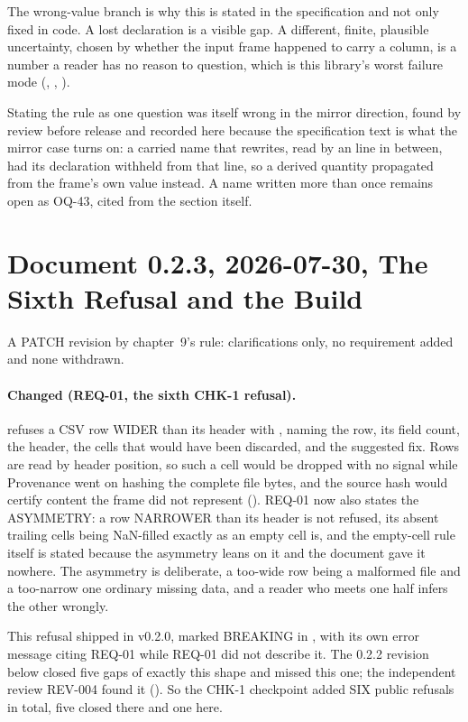 The wrong-value branch is why this is stated in the specification and not
only fixed in code. A lost declaration is a visible gap. A different,
finite, plausible uncertainty, chosen by whether the input frame happened
to carry a column, is a number a reader has no reason to question, which is
this library's worst failure mode
(, , ).

Stating the rule as one question was itself wrong in the mirror direction,
found by review before release and recorded here because the specification
text is what the mirror case turns on: a carried name that
\code{[corrections]} rewrites, read by an \code{[equations]} line in
between, had its declaration withheld from that line, so a derived quantity
propagated from the frame's own value instead. A name written more than
once remains open as OQ-43, cited from the section itself.

\section*{Document 0.2.3, 2026-07-30, The Sixth Refusal and the Build}

A PATCH revision by chapter~9's rule: clarifications only, no requirement
added and none withdrawn.

\paragraph{Changed (REQ-01, the sixth CHK-1 refusal).} 
refuses a CSV row WIDER than its header with , naming the
row, its field count, the header, the cells that would have been
discarded, and the suggested fix. Rows are read by header position, so
such a cell would be dropped with no signal while Provenance went on
hashing the complete file bytes, and the source hash would certify content
the frame did not represent (). REQ-01 now also states
the ASYMMETRY: a row NARROWER than its header is not refused, its absent
trailing cells being NaN-filled exactly as an empty cell is, and the
empty-cell rule itself is stated because the asymmetry leans on it and the
document gave it nowhere. The asymmetry is deliberate, a too-wide row
being a malformed file and a too-narrow one ordinary missing data, and a
reader who meets one half infers the other wrongly.

This refusal shipped in v0.2.0, marked BREAKING in ,
with its own error message citing REQ-01 while REQ-01 did not describe it.
The 0.2.2 revision below closed five gaps of exactly this shape and missed
this one; the independent review REV-004 found it
(). So the CHK-1 checkpoint added SIX public
refusals in total, five closed there and one here.

